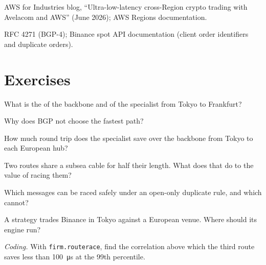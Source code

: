 \begin{omsources}
\item AWS for Industries blog, ``Ultra-low-latency cross-Region crypto trading with Avelacom and AWS'' (June 2026); AWS Regions documentation.
\item RFC 4271 (BGP-4); Binance spot API documentation (client order identifiers and duplicate orders).
\end{omsources}

\section{Exercises}

\begin{exercise}[$\star$]\label{exo:nw:cross-region-crypto-networks:1}
What is the  of the backbone and of the specialist from Tokyo to Frankfurt?
\end{exercise}

\begin{exercise}[$\star$]\label{exo:nw:cross-region-crypto-networks:2}
Why does BGP not choose the fastest path?
\end{exercise}

\begin{exercise}[$\star$]\label{exo:nw:cross-region-crypto-networks:3}
How much round trip does the specialist save over the backbone from Tokyo to each European hub?
\end{exercise}

\begin{exercise}[$\star\star$]\label{exo:nw:cross-region-crypto-networks:4}
Two routes share a subsea cable for half their length. What does that do to the value of racing them?
\end{exercise}

\begin{exercise}[$\star\star$]\label{exo:nw:cross-region-crypto-networks:5}
Which messages can be raced safely under an open-only duplicate rule, and which cannot?
\end{exercise}

\begin{exercise}[$\star\star$]\label{exo:nw:cross-region-crypto-networks:6}
A strategy trades Binance in Tokyo against a European venue. Where should its engine run?
\end{exercise}

\begin{exercise}[$\star\star\star$]\label{exo:nw:cross-region-crypto-networks:7}
\emph{Coding.} With \texttt{firm.routerace}, find the correlation above which the third route saves less than \qty{100}{\micro\second} at the 99th
percentile.
\end{exercise}

